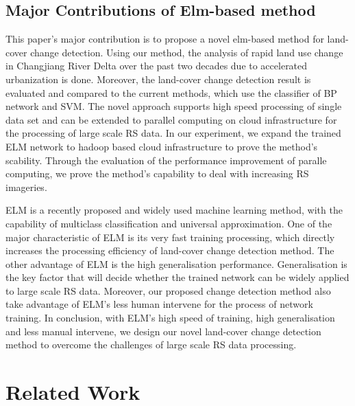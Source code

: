 \documentclass{elsart}
\begin{document}
\subsection{Major Contributions of Elm-based method}
This paper's major contribution is to propose a novel elm-based method for land-cover change detection. 
Using our method, the analysis of rapid land use change in Changjiang River Delta over the past two decades due to accelerated urbanization is done.
Moreover, the land-cover change detection result is evaluated and compared to the current methods, which use the classifier of BP network and SVM.
The novel approach supports high speed processing of single data set and can be extended to parallel computing on cloud infrastructure for the processing of large scale RS data.
In our experiment, we expand the trained ELM network to hadoop based cloud infrastructure to prove the method's scability.
Through the evaluation of the performance improvement of paralle computing, we prove the method's capability to deal with increasing RS imageries.  
\par
ELM is a recently proposed and widely used machine learning method, with the capability of multiclass classification and universal approximation\cite{Huang2012}\cite{Huang2000}\cite{Zhang2007}\cite{Huang2006}.
One of the major characteristic of ELM is its very fast training processing, which directly increases the processing efficiency of land-cover change detection method.
The other advantage of ELM is the high generalisation performance. Generalisation is the key factor that will decide whether the trained network can be widely applied to large scale RS data.
Moreover, our proposed change detection method also take advantage of ELM's less human intervene for the process of network training.
In conclusion, with ELM's high speed of training, high generalisation and less manual intervene, we design our novel land-cover change detection method to overcome the challenges of large scale RS data processing. 

\section{Related Work}
\end{document}
